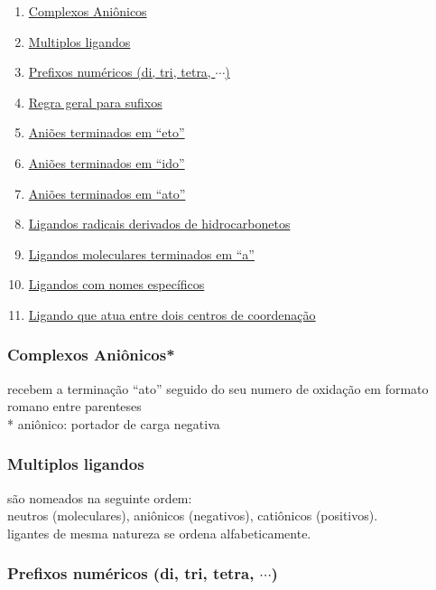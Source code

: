 \documentclass[12pt]{report}
\begin{document}
\renewcommand{\theenumi}{\arabic{enumi}}
\noindent\begin{multicols}{2}
	
	\begin{enumerate}
	\item \hyperlink{regras1}{Complexos Aniônicos}
	\item \hyperlink{regras2}{Multiplos ligandos}
	\item \hyperlink{regras3}%
		{Prefixos numéricos (di, tri, tetra, $\cdots$)}
	\item \hyperlink{regras4}{Regra geral para sufixos}
	\item \hyperlink{regras5}{Aniões terminados em ``eto''}
	\item \hyperlink{regras6}{Aniões terminados em ``ido''}
	\item \hyperlink{regras7}{Aniões terminados em ``ato''}
	\item \hyperlink{regras8}%
		{Ligandos radicais derivados de hidrocarbonetos}
	\item \hyperlink{regras9}%
		{Ligandos moleculares terminados em ``a''}
	\item \hyperlink{regras10}{Ligandos com nomes específicos}
	\item \hyperlink{regras11}%
		{Ligando que atua entre dois centros de coordenação}
	\end{enumerate}
	
\end{multicols}

\hypertarget{regras1}{}%
\subsubsection{Complexos Aniônicos*}

recebem a terminação ``ato'' seguido do seu numero de oxidação em formato romano entre parenteses\\
* aniônico: portador de carga negativa

\hypertarget{regras2}{}%
\subsubsection{Multiplos ligandos}

são nomeados na seguinte ordem:\\
neutros (moleculares), aniônicos (negativos), catiônicos (positivos).\\
ligantes de mesma natureza se ordena alfabeticamente.

\hypertarget{regras3}{}%
\subsubsection{Prefixos numéricos (di, tri, tetra, $\cdots$)}
\end{document}
